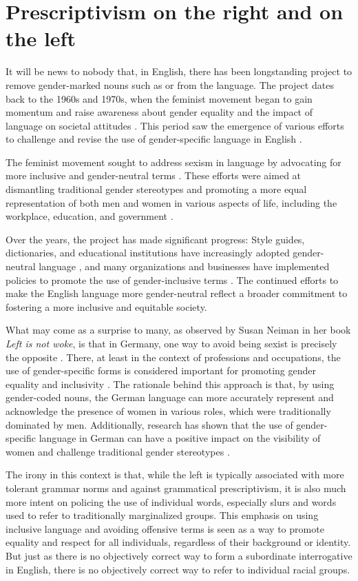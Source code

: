 \chapter{Prescriptivism on the right and on the left}
It will be news to nobody that, in English, there has been longstanding project to remove gender-marked nouns such as  or  from the language. The project dates back to the 1960s and 1970s, when the feminist movement began to gain momentum and raise awareness about gender equality and the impact of language on societal attitudes \citep{cameron1998}. This period saw the emergence of various efforts to challenge and revise the use of gender-specific language in English \citep{lakoff1973}.

The feminist movement sought to address sexism in language by advocating for more inclusive and gender-neutral terms \citep{miller1976}. These efforts were aimed at dismantling traditional gender stereotypes and promoting a more equal representation of both men and women in various aspects of life, including the workplace, education, and government \citep{spender1980}.

Over the years, the project has made significant progress: Style guides, dictionaries, and educational institutions have increasingly adopted gender-neutral language \citep{baron1986}, and many organizations and businesses have implemented policies to promote the use of gender-inclusive terms \citep{maggio1998}. The continued efforts to make the English language more gender-neutral reflect a broader commitment to fostering a more inclusive and equitable society.

What may come as a surprise to many, as observed by Susan Neiman in her book \textit{Left is not woke}, is that in Germany, one way to avoid being sexist is precisely the opposite \citep{neiman2023}. There, at least in the context of professions and occupations, the use of gender-specific forms is considered important for promoting gender equality and inclusivity \citep{diewald2018}. The rationale behind this approach is that, by using gender-coded nouns, the German language can more accurately represent and acknowledge the presence of women in various roles, which were traditionally dominated by men. Additionally, research has shown that the use of gender-specific language in German can have a positive impact on the visibility of women and challenge traditional gender stereotypes \citep{Vervecken2012}.

The irony in this context is that, while the left is typically associated with more tolerant grammar norms and against grammatical prescriptivism, it is also much more intent on policing the use of individual words, especially slurs and words used to refer to traditionally marginalized groups. This emphasis on using inclusive language and avoiding offensive terms is seen as a way to promote equality and respect for all individuals, regardless of their background or identity. But just as there is no objectively correct way to form a subordinate interrogative in English, there is no objectively correct way to refer to individual racial groups.


